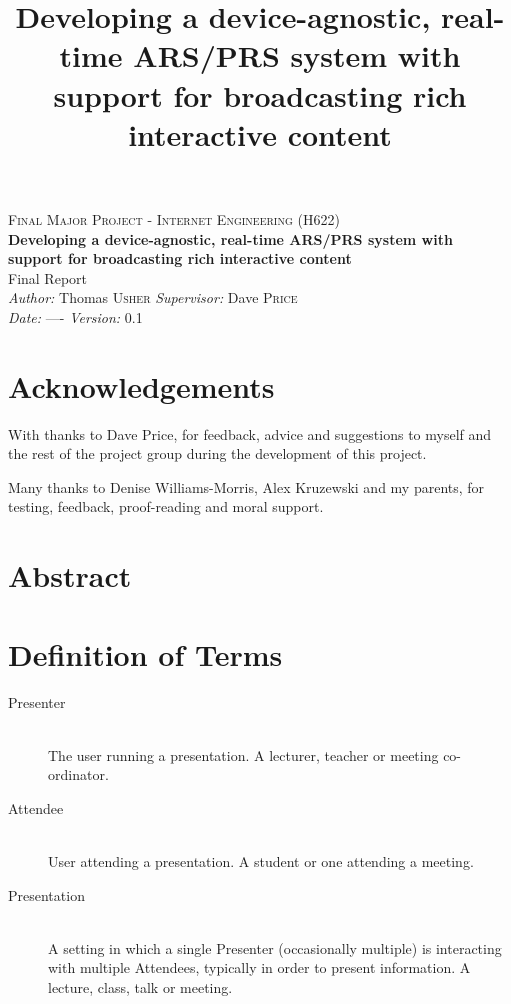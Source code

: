 \documentclass[a4papert,11pt,notitlepage]{ltxdoc}
\title{Developing a device-agnostic, real-time ARS/PRS system with support for
broadcasting rich interactive content}
\begin{document}
\vspace*{\fill}
\begin{center}
\textsc{\Large Final Major Project - Internet Engineering (H622)}\\[0.3cm]
{\Large \bfseries Developing a device-agnostic, real-time ARS/PRS system with support for
broadcasting rich interactive content}\\[0.3cm]
{\Large Final Report}\\[0.3cm]
\emph{Author:} Thomas \textsc{Usher} \hspace{1cm} \emph{Supervisor:} Dave \textsc{Price}\\
\emph{Date:} ---- \hspace{1cm} \emph{Version:} 0.1
\end{center}
\vspace*{\fill}
\pagebreak

\section*{Acknowledgements}
With thanks to Dave Price, for feedback, advice and suggestions to myself and the rest of the project group during the development of this project.

Many thanks to Denise Williams-Morris, Alex Kruzewski and my parents, for testing, feedback, proof-reading and moral support.

\listoftodos{}
\pagebreak

\section*{Abstract}

\section*{Definition of Terms}
\begin{description}
\item[Presenter] \hfill \\
The user running a presentation. A lecturer, teacher or meeting co-ordinator.
\item[Attendee] \hfill \\
User attending a presentation. A student or one attending a meeting.
\item[Presentation] \hfill \\
A setting in which a single Presenter (occasionally multiple) is interacting with multiple Attendees, typically in order to present information. A lecture, class, talk or meeting.
\end{description}
\end{document}
